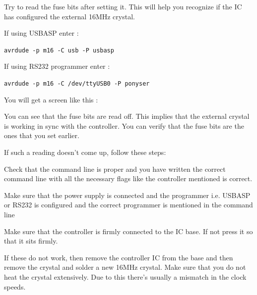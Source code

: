 \documentclass[12pt]{article}
\begin{document}
Try to read the fuse bits after setting it. This will help you recognize if the IC has configured the external 16MHz crystal.\vspace{12pt}

If using USBASP enter : 

\vspace{12pt}

\texttt{avrdude -p m16 -C usb -P usbasp}

\vspace{12pt}

If using RS232 programmer enter :

\vspace{12pt}

\texttt{avrdude -p m16 -C /dev/ttyUSB0 -P ponyser}

\vspace{12pt}

You will get a screen like this :

You can see that the fuse bits are read off. This implies that the external crystal is working in sync with the controller. You can verify that the fuse bits are the ones that you set earlier. 

\newpage If such a reading doesn't come up, follow these steps:

\vspace{12pt}

\checkmark Check that the command line is proper and you have written the correct command line with all the necessary flags like the controller mentioned is correct.

\vspace{12pt}

\checkmark Make sure that the power supply is connected and the programmer i.e. USBASP or RS232 is configured and the correct programmer is mentioned in the command line

\vspace{12pt}

\checkmark Make sure that the controller is firmly connected to the IC base. If not press it so that it sits firmly.

\vspace{12pt}

\checkmark If these do not work, then remove the controller IC from the base and then remove the crystal and solder a new 16MHz crystal. Make sure that you do not heat the crystal extensively. Due to this there's usually a mismatch in the clock speeds.
\end{document}
